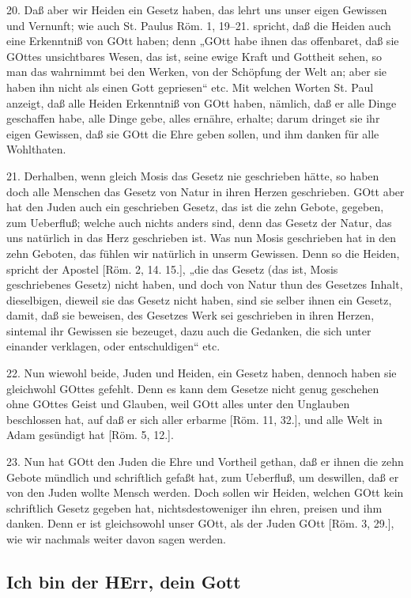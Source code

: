 20. Daß aber wir Heiden ein Gesetz haben, das lehrt uns unser eigen Gewissen und Vernunft; wie auch St. Paulus Röm. 1, 19–21. spricht, daß die Heiden auch eine Erkenntniß von GOtt haben; denn „GOtt habe ihnen das offenbaret, daß sie GOttes unsichtbares Wesen, das ist, seine ewige Kraft und Gottheit sehen, so man das wahrnimmt bei den Werken, von der Schöpfung der Welt an; aber sie haben ihn nicht als einen Gott gepriesen“ etc. Mit welchen Worten St. Paul anzeigt, daß alle Heiden Erkenntniß von GOtt haben, nämlich, daß er alle Dinge geschaffen habe, alle Dinge gebe, alles ernähre, erhalte; darum dringet sie ihr eigen Gewissen, daß sie GOtt die Ehre geben sollen, und ihm danken für alle Wohlthaten.

21. Derhalben, wenn gleich Mosis das Gesetz nie geschrieben hätte, so haben doch alle Menschen das Gesetz von Natur in ihren Herzen geschrieben. GOtt aber hat den Juden auch ein geschrieben Gesetz, das ist die zehn Gebote, gegeben, zum Ueberfluß; welche auch nichts anders sind, denn das Gesetz der Natur, das uns natürlich in das Herz geschrieben ist. Was nun Mosis geschrieben hat in den zehn Geboten, das fühlen wir natürlich in unserm Gewissen. Denn so die Heiden, spricht der Apostel [Röm. 2, 14. 15.], „die das Gesetz (das ist, Mosis geschriebenes Gesetz) nicht haben, und doch von Natur thun des Gesetzes Inhalt, dieselbigen, dieweil sie das Gesetz nicht haben, sind sie selber ihnen ein Gesetz, damit, daß sie beweisen, des Gesetzes Werk sei geschrieben in ihren Herzen, sintemal ihr Gewissen sie bezeuget, dazu auch die Gedanken, die sich unter einander verklagen, oder entschuldigen“ etc.

22. Nun wiewohl beide, Juden und Heiden, ein Gesetz haben, dennoch haben sie gleichwohl GOttes gefehlt. Denn es kann dem Gesetze nicht genug geschehen ohne GOttes Geist und Glauben, weil GOtt alles unter den Unglauben beschlossen hat, auf daß er sich aller erbarme [Röm. 11, 32.], und alle Welt in Adam gesündigt hat [Röm. 5, 12.].

23. Nun hat GOtt den Juden die Ehre und Vortheil gethan, daß er ihnen die zehn Gebote mündlich und schriftlich gefaßt hat, zum Ueberfluß, um deswillen, daß er von den Juden wollte Mensch werden. Doch sollen wir Heiden, welchen GOtt kein schriftlich Gesetz gegeben hat, nichtsdestoweniger ihn ehren, preisen und ihm danken. Denn er ist gleichsowohl unser GOtt, als der Juden GOtt [Röm. 3, 29.], wie wir nachmals weiter davon sagen werden.

\subsection{Ich bin der HErr, dein Gott}

